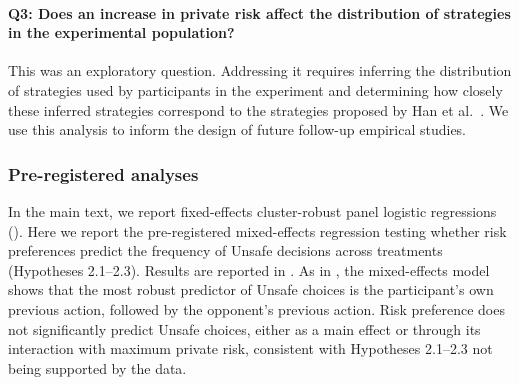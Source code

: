 \documentclass[pdflatex,sn-mathphys-ay]{sn-jnl}
\theoremstyle{thmstyleone}
\theoremstyle{thmstyletwo}
\theoremstyle{thmstylethree}
\begin{document}
\paragraph{Q3: Does an increase in private risk affect the distribution of strategies in the experimental population?}

This was an exploratory question. Addressing it requires inferring the distribution of strategies used by participants in the experiment and determining how closely these inferred strategies correspond to the strategies proposed by Han et al.~\citep{han2020toRegulateOrNot}. We use this analysis to inform the design of future follow-up empirical studies.

\subsubsection{Pre-registered analyses}
\label{si:sec:prereg-analyses}

In the main text, we report fixed-effects cluster-robust panel logistic regressions (). Here we report the pre-registered mixed-effects regression \citep{brown2021linearMixedEffectsR} testing whether risk preferences predict the frequency of Unsafe decisions across treatments (Hypotheses 2.1--2.3). Results are reported in . As in , the mixed-effects model shows that the most robust predictor of Unsafe choices is the participant's own previous action, followed by the opponent's previous action. Risk preference does not significantly predict Unsafe choices, either as a main effect or through its interaction with maximum private risk, consistent with Hypotheses 2.1--2.3 not being supported by the data.
\end{document}
